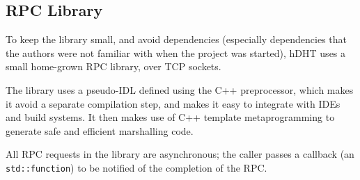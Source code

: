 \subsection{RPC Library}

To keep the library small, and avoid dependencies (especially dependencies that the authors were not familiar with when the project was started), hDHT uses a small home-grown RPC library, over TCP sockets.

The library uses a pseudo-IDL defined using the C++ preprocessor, which makes it avoid a separate compilation step, and makes it easy to integrate with IDEs and build systems.
It then makes use of C++ template metaprogramming to generate safe and efficient marshalling code.

All RPC requests in the library are asynchronous; the caller passes a callback (an \texttt{std::function}) to be notified of the completion of the RPC.
